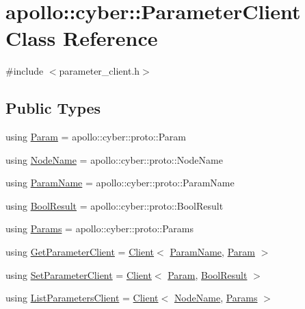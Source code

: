 \hypertarget{classapollo_1_1cyber_1_1ParameterClient}{\section{apollo\-:\-:cyber\-:\-:Parameter\-Client Class Reference}
\label{classapollo_1_1cyber_1_1ParameterClient}
}


{\ttfamily \#include $<$parameter\-\_\-client.\-h$>$}

\subsection*{Public Types}
\begin{DoxyCompactItemize}
\item 
using \hyperlink{classapollo_1_1cyber_1_1ParameterClient_abbe01b23559ca1166de439023c2aacd1}{Param} = apollo\-::cyber\-::proto\-::\-Param
\item 
using \hyperlink{classapollo_1_1cyber_1_1ParameterClient_ab50cca8d23f4fc3d41825d39d4d9364c}{Node\-Name} = apollo\-::cyber\-::proto\-::\-Node\-Name
\item 
using \hyperlink{classapollo_1_1cyber_1_1ParameterClient_aab6e735de877c2611b2354ea1371c142}{Param\-Name} = apollo\-::cyber\-::proto\-::\-Param\-Name
\item 
using \hyperlink{classapollo_1_1cyber_1_1ParameterClient_a3dd146d628d94d3705dccf625dbca038}{Bool\-Result} = apollo\-::cyber\-::proto\-::\-Bool\-Result
\item 
using \hyperlink{classapollo_1_1cyber_1_1ParameterClient_ad8de8a070f7cae18effe35ee1b3defb4}{Params} = apollo\-::cyber\-::proto\-::\-Params
\item 
using \hyperlink{classapollo_1_1cyber_1_1ParameterClient_a8ec0154a2d14d3852069716a4b553c5f}{Get\-Parameter\-Client} = \hyperlink{classapollo_1_1cyber_1_1Client}{Client}$<$ \hyperlink{classapollo_1_1cyber_1_1ParameterClient_aab6e735de877c2611b2354ea1371c142}{Param\-Name}, \hyperlink{classapollo_1_1cyber_1_1ParameterClient_abbe01b23559ca1166de439023c2aacd1}{Param} $>$
\item 
using \hyperlink{classapollo_1_1cyber_1_1ParameterClient_a2148326d395df8bc05fa03e1c92ad8fc}{Set\-Parameter\-Client} = \hyperlink{classapollo_1_1cyber_1_1Client}{Client}$<$ \hyperlink{classapollo_1_1cyber_1_1ParameterClient_abbe01b23559ca1166de439023c2aacd1}{Param}, \hyperlink{classapollo_1_1cyber_1_1ParameterClient_a3dd146d628d94d3705dccf625dbca038}{Bool\-Result} $>$
\item 
using \hyperlink{classapollo_1_1cyber_1_1ParameterClient_a5a6fef80c4ea818e6380dd49fe4843e9}{List\-Parameters\-Client} = \hyperlink{classapollo_1_1cyber_1_1Client}{Client}$<$ \hyperlink{classapollo_1_1cyber_1_1ParameterClient_ab50cca8d23f4fc3d41825d39d4d9364c}{Node\-Name}, \hyperlink{classapollo_1_1cyber_1_1ParameterClient_ad8de8a070f7cae18effe35ee1b3defb4}{Params} $>$
\end{DoxyCompactItemize}
